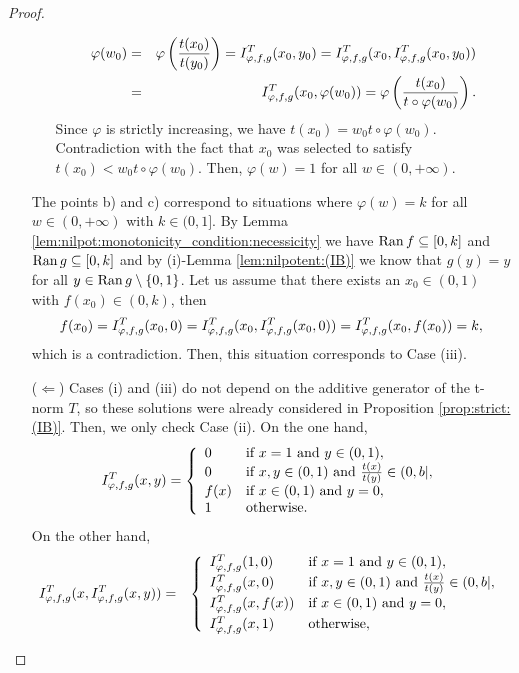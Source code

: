 \begin{proof}
\begin{itemize}
\begin{enumerate}[label=\alph*)]
		\begin{eqnarray*}
		\varphi(w_0) &=& \varphi \left(\frac{t(x_0)}{t(y_0)}\right) = I^T_{\varphi,f,g}(x_0,y_0) = I^T_{\varphi,f,g}(x_0,I^T_{\varphi,f,g}(x_0,y_0)) \\
		&=& I^T_{\varphi,f,g}(x_0,\varphi(w_0)) 
		= \varphi \left(\frac{t(x_0)}{t \circ \varphi(w_0)}\right).
		\end{eqnarray*}
		Since $\varphi$ is strictly increasing, we have $t(x_0)=w_0 t \circ \varphi(w_0)$. Contradiction with the fact that $x_0$ was selected to satisfy $t(x_0)<w_0t\circ \varphi(w_0)$. Then, $\varphi(w)=1$ for all $w \in (0,+\infty)$.	
	\end{enumerate}
	The points b) and c) correspond to situations where $\varphi(w)=k$ for all $w \in (0,+\infty)$ with $k \in (0,1]$. By Lemma \ref{lem:nilpot:monotonicity_condition:necessicity} we have $\operatorname{Ran} f \subseteq [0,k]$ and $\operatorname{Ran} g \subseteq [0,k]$ and by (i)-Lemma \ref{lem:nilpotent:(IB)} we know that $g(y)=y$ for all $y \in \operatorname{Ran} g \setminus \{0,1\}$. Let us assume that there exists an $x_0 \in (0,1)$ with $f(x_0) \in (0,k)$, then
	$$f(x_0) = I^T_{\varphi,f,g}(x_0,0) = I^T_{\varphi,f,g}(x_0,I^T_{\varphi,f,g}(x_0,0)) = I^T_{\varphi,f,g}(x_0,f(x_0))=k,$$
	which is a contradiction. Then, this situation corresponds to Case (iii).  
	\item[($\Leftarrow$)] Cases (i) and (iii) do not depend on the additive generator of the t-norm $T$, so these solutions were already considered in Proposition \ref{prop:strict:(IB)}. Then, we only check Case (ii). On the one hand,
	$$
	I^T_{\varphi,f,g}(x,y)
	=
	\left\{ \begin{array}{ll}
		0 &   \text{if }   x=1 \text{ and } y \in (0,1), \\
		0 &   \text{if }   x,y \in (0,1) \text{ and } \frac{t(x)}{t(y)} \in (0,b|, \\
		f(x) &   \text{if }   x \in (0,1) \text{ and } y=0, \\
		1 & \text{otherwise}.
	\end{array}
	\right.
	$$
	On the other hand,
	\begin{eqnarray*}
		\IT(x,\IT(x,y))
		&=&
		\left\{ \begin{array}{ll}
			\IT(1,0) &   \text{if }   x=1 \text{ and } y \in (0,1), \\[1pt]
			\IT(x,0) &   \text{if }   x,y \in (0,1) \text{ and } \frac{t(x)}{t(y)} \in (0,b|, \\[3pt]
			\IT(x,f(x)) &   \text{if }   x \in (0,1) \text{ and } y=0, \\[3pt]
			\IT(x,1) & \text{otherwise},
		\end{array}
		\right. \\

\end{eqnarray*}
\end{itemize}
\end{proof}

